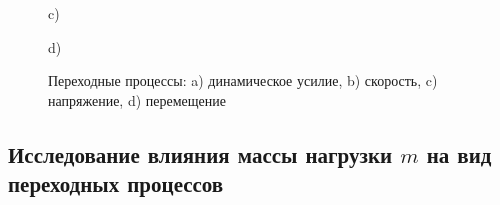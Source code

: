 \documentclass[a4paper,12pt]{article}
\begin{document}
\begin{figure}[h!]
\begin{minipage}[h]{0.47\linewidth}
			 c) \\
		\end{minipage}
		\hfill
		\begin{minipage}[h]{0.47\linewidth}
			 d) \\
		\end{minipage}
		\caption{Переходные процессы: a) динамическое усилие, b)
			скорость, c) напряжение, d) перемещение}
		\label{s_2}
	\end{figure}

	\clearpage
	\begin{center}
	\section{Исследование влияния массы нагрузки $m$ на вид переходных процессов}
	\end{center}
		
\end{document}
